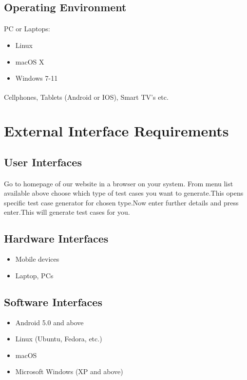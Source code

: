 \documentclass{article}
\begin{document}
\subsection{Operating Environment}
\paragraph{}
PC or Laptops:
\begin{itemize}
    \item Linux
    \item macOS X
    \item Windows 7-11
\end{itemize}
\paragraph{}
Cellphones, Tablets (Android or IOS), Smart TV's etc.


\section{External Interface Requirements}
\subsection{User Interfaces}
\paragraph{}
Go to homepage of our website in a browser on your system. From menu list available
above choose which type of test cases you want to generate.This opens specific test
case generator for chosen type.Now enter further details and press enter.This will
generate test cases for you.

\subsection{Hardware Interfaces}
\begin{itemize}
    \item Mobile devices
    \item Laptop, PCs
\end{itemize}

\subsection{Software Interfaces}
\begin{itemize}
    \item Android 5.0 and above
    \item Linux (Ubuntu, Fedora, etc.)
    \item macOS
    \item Microsoft Windows (XP and above)
\end{itemize}
\end{document}
